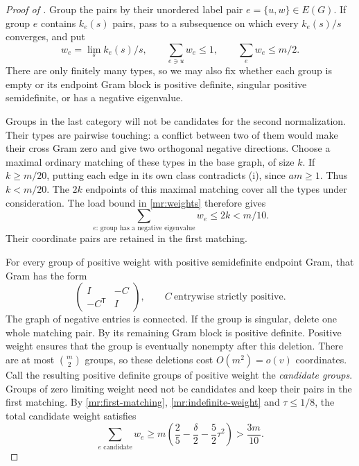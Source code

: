 \begin{proof}[Proof of ]
Group the pairs by their unordered label pair $e=\{u,w\}\in E(G)$.
If group $e$ contains $k_e(s)$ pairs, pass to a subsequence on which
every $k_e(s)/s$ converges, and put
\begin{equation}\label{mr:weights}
 w_e=\lim_s k_e(s)/s,
 \qquad \sum_{e\ni u}w_e\le1,
 \qquad \sum_e w_e\le m/2.
\end{equation}
There are only finitely many types, so we may also fix whether each
group is empty or its endpoint Gram block is positive definite,
singular positive semidefinite, or has a negative eigenvalue.

Groups in the last category will not be candidates for the second
normalization.  Their types are pairwise touching: a conflict between
two of them would make their cross Gram zero and give two orthogonal
negative directions.  Choose a maximal ordinary matching of these
types in the base graph, of size $k$.  If $k\ge m/20$, putting each edge
in its own class contradicts (i), since $am\ge1$.  Thus $k<m/20$.
The $2k$ endpoints of this maximal matching cover all the types under
consideration.  The load bound in \eqref{mr:weights} therefore gives
\begin{equation}\label{mr:indefinite-weight}
 \sum_{e:\,\text{group has a negative eigenvalue}}w_e
       \le2k<m/10.
\end{equation}
Their coordinate pairs are retained in the first matching.

For every group of positive weight with positive semidefinite endpoint
Gram, that Gram has the form
\[
 \begin{pmatrix}I&-C\\-C^{\mathsf T}&I\end{pmatrix},
 \qquad C\ \text{entrywise strictly positive}.
\]
The graph of negative entries is connected.  If the group is singular,
delete one whole matching pair.  By  its
remaining Gram block is positive definite.  Positive weight ensures
that the group is eventually nonempty after this deletion.  There are
at most $\binom m2$ groups, so these deletions cost $O(m^2)=o(v)$
coordinates.  Call the resulting positive definite groups of positive
weight the \emph{candidate groups}.  Groups of zero limiting weight
need not be candidates and keep their pairs in the first matching.
By \eqref{mr:first-matching}, \eqref{mr:indefinite-weight} and
$\tau\le1/8$, the total candidate weight satisfies
\begin{equation}\label{mr:candidate-weight}
 \sum_{e\text{ candidate}}w_e
 \ge m\left(\frac25-\frac\delta2-\frac52\tau^2\right)
 >\frac{3m}{10}.
\end{equation}


\end{proof}
